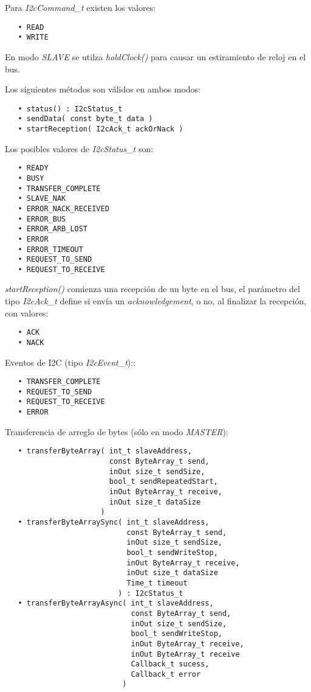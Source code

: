 Para \emph{I2cCommand\_t} existen los valores:

\begin{verbatim}
   • READ
   • WRITE
\end{verbatim}

En modo \emph{SLAVE} se utilza \emph{holdClock()} para causar un estiramiento de reloj en el bus.

Los siguientes métodos son válidos en ambos modos:

\begin{verbatim}
   • status() : I2cStatus_t
   • sendData( const byte_t data )
   • startReception( I2cAck_t ackOrNack )
\end{verbatim}

Los posibles valores de \emph{I2cStatus\_t} son:

\begin{verbatim}
   • READY
   • BUSY
   • TRANSFER_COMPLETE
   • SLAVE_NAK 
   • ERROR_NACK_RECEIVED
   • ERROR_BUS
   • ERROR_ARB_LOST
   • ERROR
   • ERROR_TIMEOUT
   • REQUEST_TO_SEND
   • REQUEST_TO_RECEIVE
\end{verbatim}

\emph{startReception()} comienza una recepción de un byte en el bus, el parámetro del tipo \emph{I2cAck\_t} define si envía un \emph{acknowledgement}, o no, al finalizar la recepción, con valores:

\begin{verbatim}
   • ACK
   • NACK
\end{verbatim}

Eventos de I2C (tipo \emph{I2cEvent\_t})::

\begin{verbatim}
   • TRANSFER_COMPLETE
   • REQUEST_TO_SEND
   • REQUEST_TO_RECEIVE
   • ERROR
\end{verbatim}


Transferencia de arreglo de bytes (sólo en modo \emph{MASTER}):

\begin{verbatim}
   • transferByteArray( int_t slaveAddress,
                        const ByteArray_t send,
                        inOut size_t sendSize,
                        bool_t sendRepeatedStart,
                        inOut ByteArray_t receive,
                        inOut size_t dataSize
                      )
   • transferByteArraySync( int_t slaveAddress,
                            const ByteArray_t send,
                            inOut size_t sendSize,
                            bool_t sendWriteStop,
                            inOut ByteArray_t receive,
                            inOut size_t dataSize
                            Time_t timeout
                          ) : I2cStatus_t
   • transferByteArrayAsync( int_t slaveAddress,
                             const ByteArray_t send,
                             inOut size_t sendSize,
                             bool_t sendWriteStop,
                             inOut ByteArray_t receive,
                             inOut ByteArray_t receive
                             Callback_t sucess,
                             Callback_t error 
                           )
\end{verbatim}

